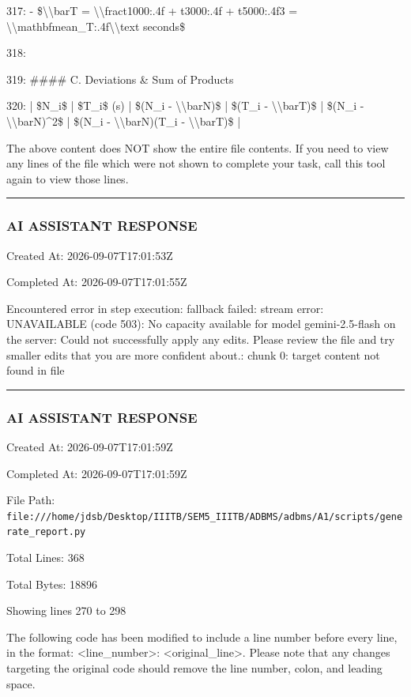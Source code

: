 \documentclass[11pt,a4paper]{article}
\begin{document}
317: - \$\textbackslash{}\textbackslash{}bar{{T}} = \textbackslash{}\textbackslash{}frac{{{t1000:.4f} + {t3000:.4f} + {t5000:.4f}}}{{3}} = \textbackslash{}\textbackslash{}mathbf{{{mean\_T:.4f}\textbackslash{}\textbackslash{}text{{ seconds}}}}\$

318:

319: \#\#\#\# C. Deviations \& Sum of Products

320: | \$N\_i\$ | \$T\_i\$ (s) | \$(N\_i - \textbackslash{}\textbackslash{}bar{{N}})\$ | \$(T\_i - \textbackslash{}\textbackslash{}bar{{T}})\$ | \$(N\_i - \textbackslash{}\textbackslash{}bar{{N}})\textasciicircum{}2\$ | \$(N\_i - \textbackslash{}\textbackslash{}bar{{N}})(T\_i - \textbackslash{}\textbackslash{}bar{{T}})\$ |

The above content does NOT show the entire file contents. If you need to view any lines of the file which were not shown to complete your task, call this tool again to view those lines.


\hrule

\subsubsection{AI ASSISTANT RESPONSE}

Created At: 2026-09-07T17:01:53Z

Completed At: 2026-09-07T17:01:55Z

Encountered error in step execution: fallback failed: stream error: UNAVAILABLE (code 503): No capacity available for model gemini-2.5-flash on the server: Could not successfully apply any edits. Please review the file and try smaller edits that you are more confident about.: chunk 0: target content not found in file


\hrule

\subsubsection{AI ASSISTANT RESPONSE}

Created At: 2026-09-07T17:01:59Z

Completed At: 2026-09-07T17:01:59Z

File Path: \texttt{file:///home/jdsb/Desktop/IIITB/SEM5\_IIITB/ADBMS/adbms/A1/scripts/generate\_report.py}

Total Lines: 368

Total Bytes: 18896

Showing lines 270 to 298

The following code has been modified to include a line number before every line, in the format: <line\_number>: <original\_line>. Please note that any changes targeting the original code should remove the line number, colon, and leading space.
\end{document}

